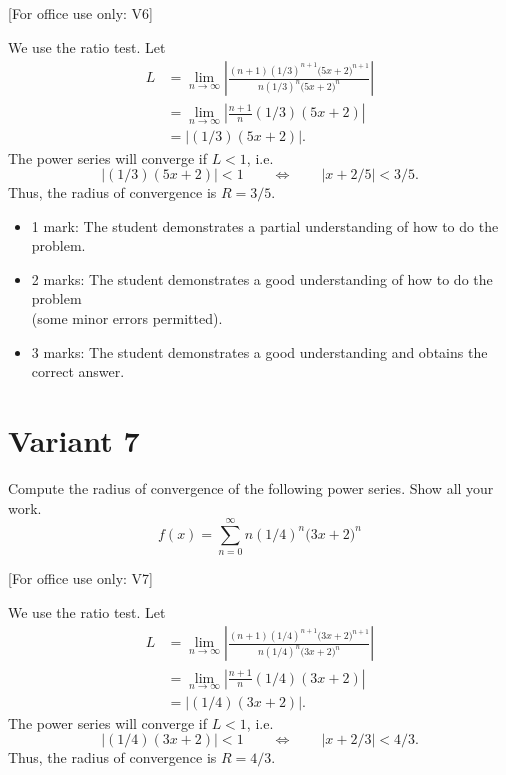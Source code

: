 \documentclass{article}
\begin{document}
[For office use only: V6]
        \medskip



    We use the ratio test. Let
      \begin{align*}
        L &= \lim_{n\to\infty} \left| 
        \frac{(n+1)\left(1/3\right)^{n+1}\big(5x + 2\big)^{n+1}}
        {n\left(1/3\right)^n \big(5x + 2\big)^n}
        \right|\\
        &= \lim_{n\to\infty} \left| \frac{n+1}{n}(1/3)(5x+2)\right| \\
        &= \left| (1/3)(5x+2)\right|.
       \end{align*}
       The power series will converge if $L < 1$, i.e.
       \[
        \left| (1/3)(5x+2)\right| < 1 \qquad\Longleftrightarrow \qquad
        \left|x + 2/5\right| < 3/5.
       \]
       Thus, the radius of convergence is $R = 3/5$.
        \medskip

            \begin{small}
            \begin{itemize}
            \item 1 mark: The student demonstrates a partial understanding of how to do the problem.
            \item 2 marks: The student demonstrates a good understanding of how to do the problem \\ (some minor errors permitted).
            \item 3 marks: The student demonstrates a good understanding and obtains the correct answer.
            \end{itemize}
            \end{small}


        \newpage
        \section{Variant 7}
        \label{v7}


Compute the radius of convergence of the following power series. Show all your work.
    \[
    f(x) = \sum_{n=0}^\infty n\left(1/4\right)^n \big(3x + 2\big)^n
    \]


[For office use only: V7]
        \medskip



    We use the ratio test. Let
      \begin{align*}
        L &= \lim_{n\to\infty} \left| 
        \frac{(n+1)\left(1/4\right)^{n+1}\big(3x + 2\big)^{n+1}}
        {n\left(1/4\right)^n \big(3x + 2\big)^n}
        \right|\\
        &= \lim_{n\to\infty} \left| \frac{n+1}{n}(1/4)(3x+2)\right| \\
        &= \left| (1/4)(3x+2)\right|.
       \end{align*}
       The power series will converge if $L < 1$, i.e.
       \[
        \left| (1/4)(3x+2)\right| < 1 \qquad\Longleftrightarrow \qquad
        \left|x + 2/3\right| < 4/3.
       \]
       Thus, the radius of convergence is $R = 4/3$.
        \medskip
\end{document}
